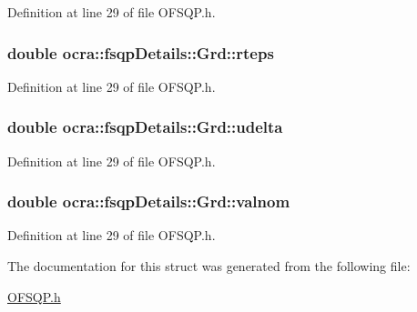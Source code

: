 Definition at line 29 of file O\+F\+S\+Q\+P.\+h.

\subsubsection[{\texorpdfstring{rteps}{rteps}}]{\setlength{\rightskip}{0pt plus 5cm}double ocra\+::fsqp\+Details\+::\+Grd\+::rteps}\hypertarget{structocra_1_1fsqpDetails_1_1Grd_ae0d611f0b701559540811d37c36dba6a}{}\label{structocra_1_1fsqpDetails_1_1Grd_ae0d611f0b701559540811d37c36dba6a}


Definition at line 29 of file O\+F\+S\+Q\+P.\+h.

\subsubsection[{\texorpdfstring{udelta}{udelta}}]{\setlength{\rightskip}{0pt plus 5cm}double ocra\+::fsqp\+Details\+::\+Grd\+::udelta}\hypertarget{structocra_1_1fsqpDetails_1_1Grd_aa1e099590097141f48dc6445cbefd5b1}{}\label{structocra_1_1fsqpDetails_1_1Grd_aa1e099590097141f48dc6445cbefd5b1}


Definition at line 29 of file O\+F\+S\+Q\+P.\+h.

\subsubsection[{\texorpdfstring{valnom}{valnom}}]{\setlength{\rightskip}{0pt plus 5cm}double ocra\+::fsqp\+Details\+::\+Grd\+::valnom}\hypertarget{structocra_1_1fsqpDetails_1_1Grd_ab59ae66f9f4318da4a7b071ff2c9740a}{}\label{structocra_1_1fsqpDetails_1_1Grd_ab59ae66f9f4318da4a7b071ff2c9740a}


Definition at line 29 of file O\+F\+S\+Q\+P.\+h.



The documentation for this struct was generated from the following file\+:\begin{DoxyCompactItemize}
\item 
\hyperlink{OFSQP_8h}{O\+F\+S\+Q\+P.\+h}\end{DoxyCompactItemize}
